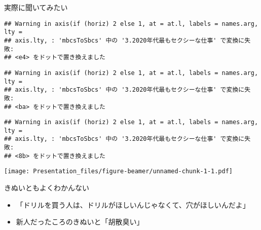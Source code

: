 \documentclass[ignorenonframetext,]{beamer}
\providecommand{\tightlist}{%
  \setlength{\itemsep}{0pt}\setlength{\parskip}{0pt}}
\begin{document}
\begin{frame}[fragile]{実際に聞いてみたい}
\begin{verbatim}
## Warning in axis(if (horiz) 2 else 1, at = at.l, labels = names.arg, lty =
## axis.lty, : 'mbcsToSbcs' 中の '3.2020年代最もセクシーな仕事' で変換に失敗:
## <e4> をドットで置き換えました
\end{verbatim}

\begin{verbatim}
## Warning in axis(if (horiz) 2 else 1, at = at.l, labels = names.arg, lty =
## axis.lty, : 'mbcsToSbcs' 中の '3.2020年代最もセクシーな仕事' で変換に失敗:
## <ba> をドットで置き換えました
\end{verbatim}

\begin{verbatim}
## Warning in axis(if (horiz) 2 else 1, at = at.l, labels = names.arg, lty =
## axis.lty, : 'mbcsToSbcs' 中の '3.2020年代最もセクシーな仕事' で変換に失敗:
## <8b> をドットで置き換えました
\end{verbatim}

\texttt{[image: Presentation\_files/figure-beamer/unnamed-chunk-1-1.pdf]}

\end{frame}

\begin{frame}{きぬいともよくわかんない}

\begin{itemize}
\tightlist
\item
  「ドリルを買う人は、ドリルがほしいんじゃなくて、穴がほしいんだよ」
\end{itemize}

\begin{itemize}
\tightlist
\item
  新人だったころのきぬいと「胡散臭い」
\end{itemize}

\end{frame}
\end{document}
